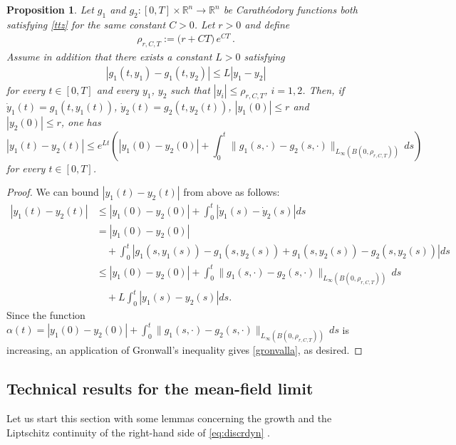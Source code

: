 \documentclass[A4paper,11pt]{article}
\newtheorem{proposition}[theorem]{Proposition}
\theoremstyle{definition}
\newcommand{\R}{\mathbb{R}}
\begin{document}
\begin{proposition}\label{le:uniquecara}
Let $g_1$ and $g_2\colon[0,T]\times \R^n \to \R^n$ be Carath{\'e}odory functions both satisfying \eqref{ttz} for the same  constant $C > 0$. Let $r>0$ and define 
\begin{align*}
\rho_{r, C, T}:=\Big(r+ CT\Big) \,e^{CT}\,.
\end{align*}
Assume in addition that there exists a constant $L > 0$ satisfying
\begin{align*}
|g_1(t, y_1)-g_1(t, y_2)|\le L|y_1-y_2|
\end{align*}
for every $t \in [0, T]$ and every $y_1$, $y_2$ such that $|y_i|\le \rho_{r, C, T}$, $i=1,2$.
Then, if $\dot y_1(t)=g_1(t, y_1(t))$, $\dot y_2(t)=g_2(t, y_2(t))$, $|y_1(0)|\le r$ and $|y_2(0)|\le r$, one has
\begin{equation}\label{gronvalla}
|y_1(t)-y_2(t)|\le e^{Lt}\left(|y_1(0)-y_2(0)|+\int_0^t \|g_1(s, \cdot)-g_2(s, \cdot)\|_{L_\infty(B(0, \rho_{r, C, T}))} \,ds \right)
\end{equation}
for every $t \in [0, T]$.
\end{proposition}
\begin{proof}
We can bound $|y_1(t) - y_2(t)|$ from above as follows:
\begin{align*}
|y_1(t) - y_2(t)| &\leq |y_1(0) - y_2(0)| + \int^t_0 |\dot{y}_1(s) - \dot{y}_2(s)| ds \\
&= |y_1(0) - y_2(0)| \\
& \quad + \int^t_0 |g_1(s, y_1(s)) - g_1(s, y_2(s)) + g_1(s, y_2(s)) - g_2(s, y_2(s))| ds \\
& \leq |y_1(0) - y_2(0)| + \int_0^t \|g_1(s, \cdot)-g_2(s, \cdot)\|_{L_\infty(B(0, \rho_{r, C, T}))} \,ds \\
& \quad  + L \int^t_0|y_1(s) - y_2(s)| ds.
\end{align*}
Since the function $\alpha(t) = |y_1(0) - y_2(0)| + \int_0^t \|g_1(s, \cdot)-g_2(s, \cdot)\|_{L_\infty(B(0, \rho_{r, C, T}))} \,ds$ is increasing, an application of Gronwall's inequality gives \eqref{gronvalla}, as desired.
\end{proof}



\subsection{Technical results for the mean-field limit}\label{ap1}

Let us start this section with some lemmas concerning the growth and the Liptschitz continuity of the right-hand side of  \eqref{eq:discrdyn} .
\end{document}

